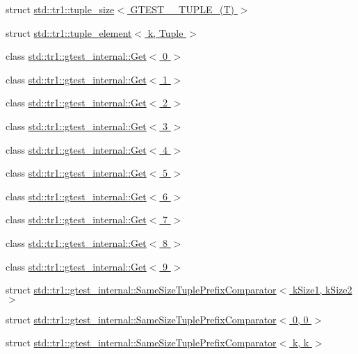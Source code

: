 \begin{DoxyCompactItemize}
struct \hyperlink{structstd_1_1tr1_1_1tuple__size_3_01_g_t_e_s_t__10___t_u_p_l_e___07_t_08_01_4}{std\-::tr1\-::tuple\-\_\-size$<$ G\-T\-E\-S\-T\-\_\-\_\-\-T\-U\-P\-L\-E\-\_\-(\-T) $>$}
\item 
struct \hyperlink{structstd_1_1tr1_1_1tuple__element}{std\-::tr1\-::tuple\-\_\-element$<$ k, Tuple $>$}
\item 
class \hyperlink{classstd_1_1tr1_1_1gtest__internal_1_1_get_3_010_01_4}{std\-::tr1\-::gtest\-\_\-internal\-::\-Get$<$ 0 $>$}
\item 
class \hyperlink{classstd_1_1tr1_1_1gtest__internal_1_1_get_3_011_01_4}{std\-::tr1\-::gtest\-\_\-internal\-::\-Get$<$ 1 $>$}
\item 
class \hyperlink{classstd_1_1tr1_1_1gtest__internal_1_1_get_3_012_01_4}{std\-::tr1\-::gtest\-\_\-internal\-::\-Get$<$ 2 $>$}
\item 
class \hyperlink{classstd_1_1tr1_1_1gtest__internal_1_1_get_3_013_01_4}{std\-::tr1\-::gtest\-\_\-internal\-::\-Get$<$ 3 $>$}
\item 
class \hyperlink{classstd_1_1tr1_1_1gtest__internal_1_1_get_3_014_01_4}{std\-::tr1\-::gtest\-\_\-internal\-::\-Get$<$ 4 $>$}
\item 
class \hyperlink{classstd_1_1tr1_1_1gtest__internal_1_1_get_3_015_01_4}{std\-::tr1\-::gtest\-\_\-internal\-::\-Get$<$ 5 $>$}
\item 
class \hyperlink{classstd_1_1tr1_1_1gtest__internal_1_1_get_3_016_01_4}{std\-::tr1\-::gtest\-\_\-internal\-::\-Get$<$ 6 $>$}
\item 
class \hyperlink{classstd_1_1tr1_1_1gtest__internal_1_1_get_3_017_01_4}{std\-::tr1\-::gtest\-\_\-internal\-::\-Get$<$ 7 $>$}
\item 
class \hyperlink{classstd_1_1tr1_1_1gtest__internal_1_1_get_3_018_01_4}{std\-::tr1\-::gtest\-\_\-internal\-::\-Get$<$ 8 $>$}
\item 
class \hyperlink{classstd_1_1tr1_1_1gtest__internal_1_1_get_3_019_01_4}{std\-::tr1\-::gtest\-\_\-internal\-::\-Get$<$ 9 $>$}
\item 
struct \hyperlink{structstd_1_1tr1_1_1gtest__internal_1_1_same_size_tuple_prefix_comparator}{std\-::tr1\-::gtest\-\_\-internal\-::\-Same\-Size\-Tuple\-Prefix\-Comparator$<$ k\-Size1, k\-Size2 $>$}
\item 
struct \hyperlink{structstd_1_1tr1_1_1gtest__internal_1_1_same_size_tuple_prefix_comparator_3_010_00_010_01_4}{std\-::tr1\-::gtest\-\_\-internal\-::\-Same\-Size\-Tuple\-Prefix\-Comparator$<$ 0, 0 $>$}
\item 
struct \hyperlink{structstd_1_1tr1_1_1gtest__internal_1_1_same_size_tuple_prefix_comparator_3_01k_00_01k_01_4}{std\-::tr1\-::gtest\-\_\-internal\-::\-Same\-Size\-Tuple\-Prefix\-Comparator$<$ k, k $>$}
\end{DoxyCompactItemize}
